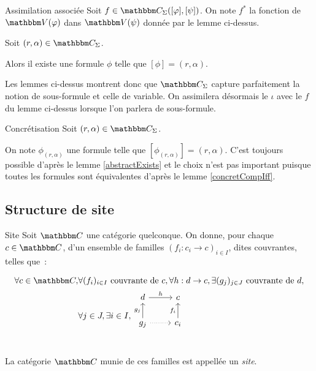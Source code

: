 \begin{defi}{Assimilation associée}
    Soit $f\in\C_\Sigma([\phi],[\psi])$. On note $f^*$ la fonction de $\V(\phi)$ dans
    $\V(\psi)$ donnée par le lemme ci-dessus.
\end{defi}

\begin{lem}\label{abstractExists}
    Soit $(r,\alpha)\in\C_\Sigma$.

    Alors il existe une formule $\phi$ telle que $[\phi] = (r,\alpha)$.
\end{lem}

Les lemmes ci-dessus montrent donc que $\C_\Sigma$ capture parfaitement la notion de
sous-formule et celle de variable. On assimilera désormais le $\iota$ avec le $f$ du
lemme ci-dessus lorsque l'on parlera de sous-formule.

\begin{defi}{Concrétisation}
    Soit $(r,\alpha)\in\C_\Sigma$.

    On note $\phi_{(r,\alpha)}$ une formule telle que $[\phi_{(r,\alpha)}] = (r,\alpha)$.
    C'est toujours possible d'après le lemme \ref{abstractExists} et le choix n'est
    pas important puisque toutes les formules sont équivalentes d'après le lemme
    \ref{concretCompIff}.
\end{defi}

\subsection{Structure de site}

\begin{defi}{Site}
    Soit $\C$ une catégorie quelconque. On donne, pour
    chaque $c\in\C$, d'un ensemble de familles $(f_i : c_i\rightarrow c)_{i\in I}$,
    dites couvrantes, telles que~:

    \begin{align*}
        \forall c\in\C, & \forall (f_i)_{i\in I} \text{ couvrante de } c,
          \forall h : d\rightarrow c, \exists (g_j)_{j\in J} \text{ couvrante de } d, \\
        & \forall j\in J, \exists i\in I,
          \begin{tikzcd}[ampersand replacement=\&]
            d \arrow[r, "h"] \& c \\
            g_j \arrow[u, "g_j"] \arrow[r, dotted] \& c_i \arrow[u, "f_i"] \\
          \end{tikzcd}
    \end{align*}

    La catégorie $\C$ munie de ces familles est appellée un \emph{site}.
\end{defi}

